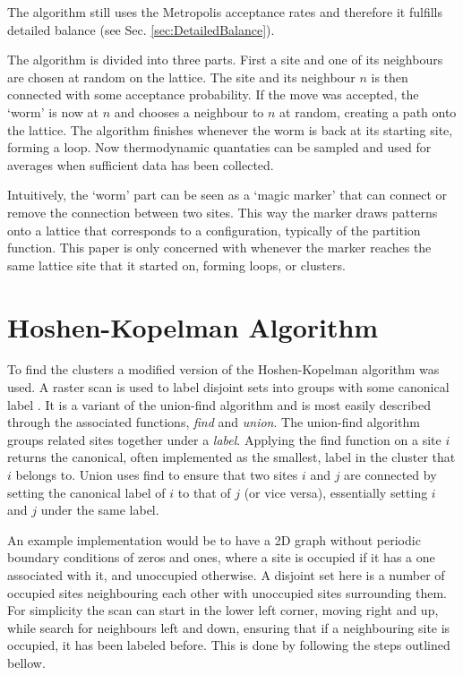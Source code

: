 The algorithm still uses the Metropolis acceptance rates and therefore it fulfills detailed balance (see Sec. \ref{sec:DetailedBalance}).

The algorithm is divided into three parts. First a site and one of its neighbours are chosen at random on the lattice. The site and its neighbour $n$ is then connected with some acceptance probability. If the move was accepted, the `worm' is now at $n$ and chooses a neighbour to $n$ at random, creating a path onto the lattice. The algorithm finishes whenever the worm is back at its starting site, forming a loop. Now thermodynamic quantaties can be sampled and used for averages when sufficient data has been collected.

Intuitively, the `worm' part can be seen as a `magic marker' that can connect or remove the connection between two sites. This way the marker draws patterns onto a lattice that corresponds to a configuration, typically of the partition function. This paper is only concerned with whenever the marker reaches the same lattice site that it started on, forming loops, or clusters.

\section{Hoshen-Kopelman Algorithm}
\label{sec:HoshenKopelman}

To find the clusters a modified version of the Hoshen-Kopelman algorithm was used. A raster scan is used to label disjoint sets into groups with some canonical label \cite{Hoshen:HKAlgo}. It is a variant of the union-find algorithm and is most easily described through the associated functions, \textit{find} and \textit{union}. The union-find algorithm groups related sites together under a \textit{label}. Applying the find function on a site $i$ returns the canonical, often implemented as the smallest, label in the cluster that $i$ belongs to. Union uses find to ensure that two sites $i$ and $j$ are connected by setting the canonical label of $i$ to that of $j$ (or vice versa), essentially setting $i$ and $j$ under the same label. 

An example implementation would be to have a 2D graph without periodic boundary conditions of zeros and ones, where a site is occupied if it has a one associated with it, and unoccupied otherwise. A disjoint set here is a number of occupied sites neighbouring each other with unoccupied sites surrounding them. For simplicity the scan can start in the lower left corner, moving right and up, while search for neighbours left and down, ensuring that if a neighbouring site is occupied, it has been labeled before. This is done by following the steps outlined bellow.

